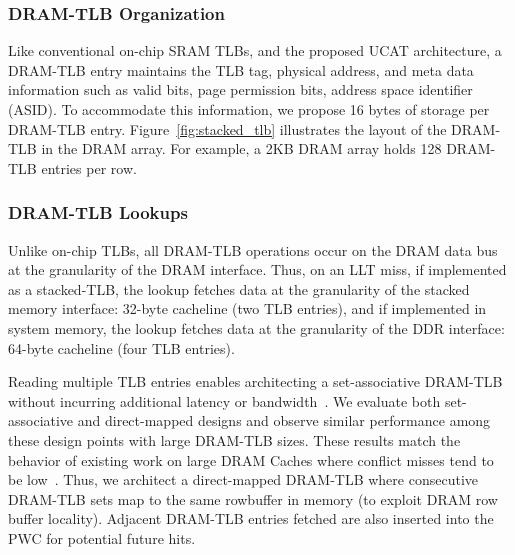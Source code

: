 
\subsubsection{DRAM-TLB Organization}

\noindent Like conventional on-chip SRAM TLBs, and the proposed UCAT
architecture, a DRAM-TLB entry maintains the TLB tag, physical
address, and meta data information such as valid bits, page permission
bits, address space identifier (ASID). To accommodate this
information, we propose 16 bytes of storage per DRAM-TLB entry.
Figure~\ref{fig:stacked_tlb} illustrates the layout of the DRAM-TLB in
the DRAM array. For example, a 2KB DRAM array holds 128 DRAM-TLB
entries per row. 

\subsubsection{DRAM-TLB Lookups}

\noindent Unlike on-chip TLBs, all DRAM-TLB operations occur on the
DRAM data bus at the granularity of the DRAM interface. Thus, on an
LLT miss, if implemented as a stacked-TLB, the lookup fetches data at
the granularity of the stacked memory interface: 32-byte cacheline
(two TLB entries), and if implemented in system memory, the lookup
fetches data at the granularity of the DDR interface: 64-byte
cacheline (four TLB entries).

Reading multiple TLB entries enables architecting a set-associative
DRAM-TLB without incurring additional latency or
bandwidth~\cite{moin2012,loh2011}. 
We evaluate both set-associative and direct-mapped
designs and observe similar performance among these design points with large DRAM-TLB sizes.
These results match the behavior of
existing work on large DRAM Caches where conflict misses tend to be
low~\cite{moin2012}. Thus, we architect a direct-mapped DRAM-TLB where
consecutive DRAM-TLB sets map to the same rowbuffer in memory (to
exploit DRAM row buffer locality). Adjacent DRAM-TLB entries fetched
are also inserted into the PWC for potential future hits.

